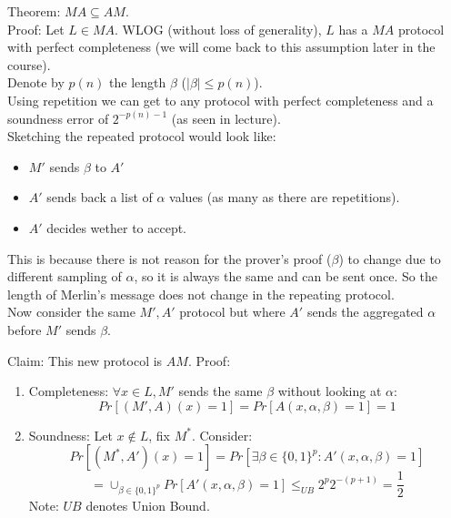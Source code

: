 Theorem: $MA\subseteq AM$.\\
Proof: Let $L\in MA$.
WLOG (without loss of generality), $L$ has a $MA$ protocol with perfect completeness (we will come back to this assumption later in the course).\\
Denote by $p(n)$ the length $\beta$ ($|\beta|\leq p(n)$).\\

Using repetition we can get to any protocol with perfect completeness and a soundness error of $2^{-p(n)-1}$ (as seen in lecture).\\
Sketching the repeated protocol would look like:
\begin{itemize}
    \item $M'$ sends $\beta$ to $A'$
    \item $A'$ sends back a list of $\alpha$ values (as many as there are repetitions).
    \item $A'$ decides wether to accept.
\end{itemize}
This is because there is not reason for the prover's proof ($\beta$) to change due to different sampling of $\alpha$, so it is always the same and can be sent once. So the length of Merlin's message does not change in the repeating protocol.\\

Now consider the same $M',A'$ protocol but where $A'$ sends the aggregated $\alpha$ before $M'$ sends $\beta$.

Claim: This new protocol is $AM$.
Proof:
\begin{enumerate}
    \item Completeness: $\forall x\in L, M'$ sends the same $\beta$ without looking at $\alpha$:
    \[Pr[(M',A)(x)=1]=Pr[A(x,\alpha,\beta)=1]=1\]
    \item Soundness: Let $x\notin L$, fix $M^*$.
    Consider:
    \[
        Pr[(M^*,A')(x)=1]
        =Pr[\exists\beta\in\{0,1\}^p: A'(x,\alpha,\beta)=1]
    \]\[
        =\cup_{\beta\in\{0,1\}^p} Pr[A'(x,\alpha,\beta)=1]
        \leq_{UB} 2^p2^{-(p+1)}=\frac{1}{2}
    \]
    Note: $UB$ denotes Union Bound.
\end{enumerate}

